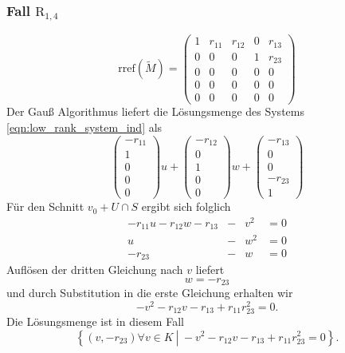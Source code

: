 \documentclass[a4paper,oneside, 11pt, openany%
]{article}
\theoremstyle{custom}
\theoremstyle{custom}
\begin{document}
\subsubsection*{Fall $\text{R}_{1,4}$}
\begin{equation*}\label{eqn:rref_r14}
	\text{rref}(\tilde{M}) =
	\left( \begin{array}{ccccc}
		1&r_{11}&r_{12}&0&r_{13}\\
		0&0&0&1&r_{23}\\
		0&0&0&0&0\\
		0&0&0&0&0\\
		0&0&0&0&0
	\end{array}\right)
\end{equation*}
Der Gauß Algorithmus liefert die Lösungsmenge des Systems \eqref{eqn:low_rank_system_ind} als
\begin{equation*}
	\begin{pmatrix}
		-r_{11}\\
		1\\
		0\\
		0\\
		0
	\end{pmatrix}u +
	\begin{pmatrix}
		-r_{12}\\
		0\\
		1\\
		0\\
		0
	\end{pmatrix}w +
	\begin{pmatrix}
		-r_{13}\\
		0\\
		0\\
		-r_{23}\\
		1
	\end{pmatrix}
\end{equation*}
Für den Schnitt $v_0 + U \cap S $ ergibt sich folglich
\begin{equation*}
	\begin{alignedat}{3}
		-r_{11}u-r_{12}w-r_{13}&-&v^2&=0\\
		u&-&w^2&=0\\
		-r_{23}&-&w&=0
	\end{alignedat}
\end{equation*}
Auflösen der dritten Gleichung nach $v$ liefert
\begin{equation*}
	w=-r_{23}
\end{equation*}
und durch Substitution in die erste Gleichung erhalten wir
\begin{equation*}
	- v^2-r_{12}v-r_{13}+r_{11}r_{23}^2 = 0.
\end{equation*}
Die Lösungsmenge ist in diesem Fall 
\begin{equation*}
	\left\{\left(v,-r_{23}\right) \forall v \in K \ \left| \ - v^2-r_{12}v-r_{13}+r_{11}r_{23}^2 = 0 \right. \right\}.
\end{equation*}
\end{document}
